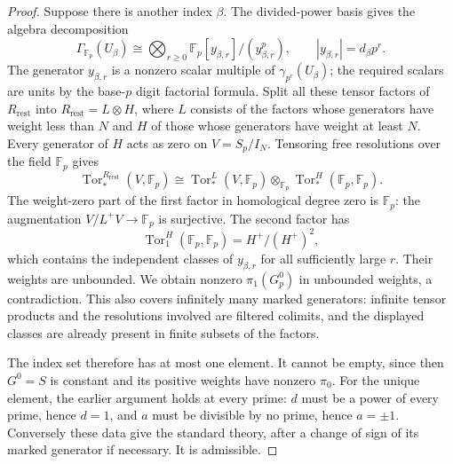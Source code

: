 \begin{proof}
Suppose there is another index $\beta$. The divided-power basis
gives the algebra decomposition
\[
 \Gamma_{\mathbb F_p}(U_\beta)
   \cong\bigotimes_{r\ge0}
       \mathbb F_p[y_{\beta,r}]/(y_{\beta,r}^{p}),
 \qquad |y_{\beta,r}|=d_\beta p^r.
\]
The generator $y_{\beta,r}$ is a nonzero scalar multiple of
$\gamma_{p^r}(U_\beta)$; the required scalars are units by the
base-$p$ digit factorial formula. Split all these tensor factors
of $R_{\mathrm{rest}}$ into
$R_{\mathrm{rest}}=L\otimes H$, where $L$ consists of the factors
whose generators have weight less than $N$ and $H$ of those whose
generators have weight at least $N$. Every generator of $H$ acts
as zero on $V=S_p/I_N$. Tensoring free resolutions over the field
$\mathbb F_p$ gives
\[
 \operatorname{Tor}_*^{R_{\mathrm{rest}}}(V,\mathbb F_p)
 \cong
 \operatorname{Tor}_*^L(V,\mathbb F_p)\otimes_{\mathbb F_p}
 \operatorname{Tor}_*^H(\mathbb F_p,\mathbb F_p).
\]
The weight-zero part of the first factor in homological degree
zero is $\mathbb F_p$: the augmentation
$V/L^+V\to\mathbb F_p$ is surjective. The second factor has
\[
 \operatorname{Tor}_1^H(\mathbb F_p,\mathbb F_p)=H^+/(H^+)^2,
\]
which contains the independent classes of $y_{\beta,r}$ for all
sufficiently large $r$. Their weights are unbounded. We obtain
nonzero $\pi_1(G_p^0)$ in unbounded weights, a contradiction.
This also covers infinitely many marked generators: infinite
tensor products and the resolutions involved are filtered
colimits, and the displayed classes are already present in finite
subsets of the factors.

The index set therefore has at most one element. It cannot be
empty, since then $G^0=S$ is constant and its positive weights
have nonzero $\pi_0$. For the unique element, the earlier argument
holds at every prime: $d$ must be a power of every prime, hence
$d=1$, and $a$ must be divisible by no prime, hence $a=\pm1$.
Conversely these data give the standard theory, after a change of
sign of its marked generator if necessary. It is admissible.
\end{proof}

